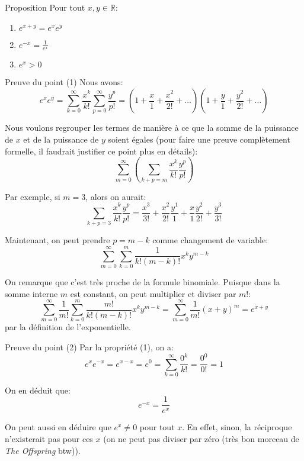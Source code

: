 \documentclass[a4paper]{article}
\begin{document}
\begin{parag}{Proposition}
    Pour tout $x, y \in \mathbb{R}$:
    \begin{enumerate}
        \item $e^{x + y} = e^x e^y$
        \item $e^{-x} = \frac{1}{e^x}$ 
        \item $e^x > 0$
    \end{enumerate}

    \begin{subparag}{Preuve du point (1)}
        Nous avons: 
        \[e^x e^y = \sum_{k=0}^{\infty} \frac{x^k}{k!} \sum_{p=0}^{\infty} \frac{y^p}{p!} = \left(1 + \frac{x}{1} + \frac{x^2}{2!} + \ldots\right)\left(1 + \frac{y}{1} + \frac{y^2}{2!} + \ldots\right)\]
        
        Nous voulons regrouper les termes de manière à ce que la somme de la puissance de $x$ et de la puissance de $y$ soient égales (pour faire une preuve complètement formelle, il faudrait justifier ce point plus en détails): 
        \[\sum_{m=0}^{\infty} \left(\sum_{k+p=m}^{} \frac{x^k}{k!} \frac{y^p}{p!}\right)\]

        Par exemple, si $m = 3$, alors on aurait: 
        \[\sum_{k+p = 3}^{} \frac{x^k}{k!} \frac{y^p}{p!} = \frac{x^3}{3!} + \frac{x^2}{2!} \frac{y^1}{1} + \frac{x}{1} \frac{y^2}{2!} + \frac{y^3}{3!}\]
        
        Maintenant, on peut prendre $p = m - k$ comme changement de variable: 
        \[\sum_{m=0}^{\infty} \sum_{k=0}^{m} \frac{1}{k!\left(m - k\right)!} x^k y^{m - k}\]

        On remarque que c'est très proche de la formule binomiale. Puisque dans la somme interne $m$ est constant, on peut multiplier et diviser par $m!$:
        \[\sum_{m=0}^{\infty} \frac{1}{m!} \sum_{k=0}^{m} \frac{m!}{k!\left(m - k\right)!} x^k y^{m - k} = \sum_{m=0}^{\infty} \frac{1}{m!} \left(x+y\right)^m = e^{x + y}\]
        par la définition de l'exponentielle.
    \end{subparag}

    \begin{subparag}{Preuve du point (2)}
        Par la propriété (1), on a: 
        \[e^x e^{-x} = e^{x - x} = e^{0} = \sum_{k=0}^{\infty} \frac{0^k}{k!} = \frac{0^0}{0!} = 1 \]

        On en déduit que: 
        \[e^{-x} = \frac{1}{e^x}\]
        
        On peut aussi en déduire que $e^x \neq 0$ pour tout $x$. En effet, sinon, la réciproque n'existerait pas pour ces $x$ (on ne peut pas diviser par zéro (très bon morceau de \textit{The Offspring} btw)).
    \end{subparag}


\end{parag}
\end{document}
